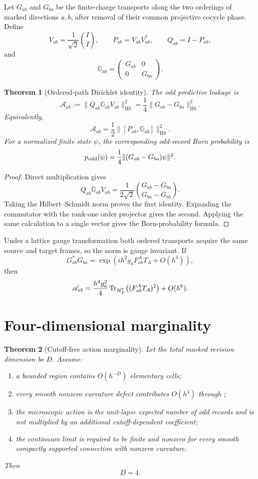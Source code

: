 \documentclass[11pt,oneside,openany]{book}
\numberwithin{equation}{chapter}
\newtheorem{theorem}{Theorem}[chapter]
\theoremstyle{definition}
\theoremstyle{remark}
\newcommand{\Tr}{\operatorname{Tr}}
\newcommand{\HS}{\mathrm{HS}}
\newcommand{\HF}{\mathcal H_F}
\newcommand{\norm}[1]{\lVert #1\rVert}
\begin{document}
Let \(G_{ab}\) and \(G_{ba}\) be the finite-charge transports along the two
orderings of marked directions \(a,b\), after removal of their common
projective cocycle phase.  Define
\[
 V_{ab}=\frac1{\sqrt2}\binom{I}{I},
 \qquad
 P_{ab}=V_{ab}V_{ab}^*,
 \qquad
 Q_{ab}=I-P_{ab},
\]
and
\[
 \mathbb G_{ab}
 =\begin{pmatrix}G_{ab}&0\\0&G_{ba}\end{pmatrix}.
\]

\begin{theorem}[Ordered-path Dirichlet identity]
\label{thm:ordered-path-action}
The odd predictive leakage is
\[
 \boxed{
 \mathscr A_{ab}
 :=\norm{Q_{ab}\mathbb G_{ab}V_{ab}}_{\HS}^2
 =\frac14\norm{G_{ab}-G_{ba}}_{\HS}^2.}
\]
Equivalently,
\[
 \boxed{
 \mathscr A_{ab}
 =\frac12\norm{[P_{ab},\mathbb G_{ab}]}_{\HS}^2.}
\]
For a normalized finite state \(\psi\), the corresponding odd-record Born
probability is
\[
 p_{\rm odd}(\psi)
 =\frac14\norm{(G_{ab}-G_{ba})\psi}^2.
\]
\end{theorem}

\begin{proof}
Direct multiplication gives
\[
 Q_{ab}\mathbb G_{ab}V_{ab}
 =\frac1{2\sqrt2}
 \binom{G_{ab}-G_{ba}}{G_{ba}-G_{ab}}.
\]
Taking the Hilbert--Schmidt norm proves the first identity.  Expanding the
commutator with the rank-one order projector gives the second.  Applying the
same calculation to a single vector gives the Born-probability formula.
\end{proof}

Under a lattice gauge transformation both ordered transports acquire the
same source and target frames, so the norm is gauge invariant.  If
\[
 G_{ab}^*G_{ba}
 =\exp\!\left(
 ih^2g_aF_{ab}^AT_A+O(h^3)
 \right),
\]
then
\[
 \mathscr A_{ab}
 =\frac{h^4g_a^2}{4}
 \Tr_{\HF^{\rm p}}\!\left((F_{ab}^AT_A)^2\right)
 +O(h^6).
\]

\section{Four-dimensional marginality}

\begin{theorem}[Cutoff-free action marginality]
\label{thm:action-marginality}
Let the total marked revision dimension be \(D\).  Assume:
\begin{enumerate}[label=\textup{(\roman*)},leftmargin=2.2em]
\item a bounded region contains \(O(h^{-D})\) elementary cells;
\item every smooth nonzero curvature defect contributes
      \(O(h^4)\) through ;
\item the microscopic action is the unit-lapse expected number of odd
      records and is not multiplied by an additional cutoff-dependent
      coefficient;
\item the continuum limit is required to be finite and nonzero for every
      smooth compactly supported connection with nonzero curvature.
\end{enumerate}
Then
\[
 \boxed{D=4.}
\]
\end{theorem}
\end{document}
